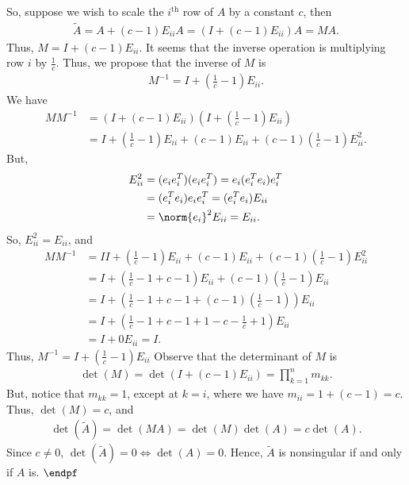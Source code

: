 \documentclass{report}
\begin{document}
    So, suppose we wish to scale the $i^{\text{th}}$ row of $A$ by a constant $c$, then
    \begin{align*}
        \tilde{A}= A + (c-1)E_{ii}A = (I + (c-1)E_{ii})A = MA
    .\end{align*} 
    Thus, $M = I + (c-1)E_{ii}$.
    \bigbreak \noindent 
    It seems that the inverse operation is multiplying row $i$ by $\frac{1}{c}$. Thus, we propose that the inverse of $M$ is
    \begin{align*}
        M^{-1} = I + \left(\frac{1}{c} - 1\right)E_{ii}
    .\end{align*}
    We have
    \begin{align*}
        MM^{-1} &= \left(I + (c-1)E_{ii}\right)\left(I + \left(\frac{1}{c}-1\right)E_{ii}\right) \\
                &= I + \left(\frac{1}{c}-1\right)E_{ii} + (c-1)E_{ii} + (c-1)\left(\frac{1}{c}-1\right)E_{ii}^{2}
    .\end{align*}
    But,
    \begin{align*}
        E_{ii}^{2} &= (e_{i}e_{i}^{T})(e_{i}e_{i}^{T}) = e_{i}(e_{i}^{T}e_{i})e_{i}^{T} \\
                   &= (e_{i}^{T}e_{i})e_{i}e_{i}^{T} = (e_{i}^{T}e_{i})E_{ii} \\
                   &= \norm{e_{i}}^{2}E_{ii} = E_{ii}
    .\end{align*}
    So, $E_{ii}^{2} = E_{ii}$, and 
    \begin{align*}
        MM^{-1} &= II + \left(\frac{1}{c}-1\right)E_{ii} + (c-1)E_{ii} + (c-1)\left(\frac{1}{c}-1\right)E_{ii}^{2} \\
        &= I + \left(\frac{1}{c}-1 + c-1\right)E_{ii} + (c-1)\left(\frac{1}{c}-1\right)E_{ii} \\
        &= I + \left(\frac{1}{c}-1 + c-1 + (c-1)\left(\frac{1}{c}-1\right)\right)E_{ii} \\
        &= I + \left(\frac{1}{c}-1+c-1 + 1 -c - \frac{1}{c} + 1\right)E_{ii} \\
        &= I + 0 E_{ii} = I
    .\end{align*}
    Thus, $M^{-1} = I + \left(\frac{1}{c}-1\right) E_{ii}$
    \bigbreak \noindent 
    Observe that the determinant of $M$ is   
    \begin{align*}
        \det(M) = \det(I + (c-1)E_{ii}) = \prod_{k=1}^{n} m_{kk}
    .\end{align*}
    But, notice that $m_{kk} =1$, except at $k=i$, where we have $m_{ii}=  1 + (c-1) = c$. Thus, $\det(M) = c $, and 
    \begin{align*}
        \det(\tilde{A}) = \det(MA) =  \det(M)\det(A) = c\det(A)
    .\end{align*}
    Since $c\ne 0$, $\det(\tilde{A}) = 0 \iff \det(A) = 0$. Hence, $\tilde{A}$ is nonsingular if and only if $A$ is. $\endpf$
\end{document}
